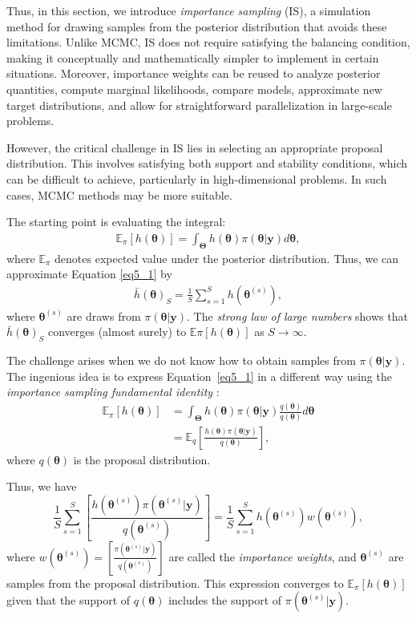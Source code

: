 Thus, in this section, we introduce \textit{importance sampling} (IS), a simulation method for drawing samples from the posterior distribution that avoids these limitations. Unlike MCMC, IS does not require satisfying the balancing condition, making it conceptually and mathematically simpler to implement in certain situations. Moreover, importance weights can be reused to analyze posterior quantities, compute marginal likelihoods, compare models, approximate new target distributions, and allow for straightforward parallelization in large-scale problems.

However, the critical challenge in IS lies in selecting an appropriate proposal distribution. This involves satisfying both support and stability conditions, which can be difficult to achieve, particularly in high-dimensional problems. In such cases, MCMC methods may be more suitable.

The starting point is evaluating the integral:
\begin{align}\label{eq5_1}
	\mathbb{E}_{\pi}[h(\bm{\theta})]=\int_{\bm{\Theta}} h(\bm{\theta}) \pi(\bm{\theta}|\bm{y})d\bm{\theta},
\end{align}
where $\mathbb{E}_{\pi}$ denotes expected value under the posterior distribution.
Thus, we can approximate Equation \ref{eq5_1} by
\begin{align}\label{eq5_2}
	\bar{h}(\bm{\theta})_S=\frac{1}{S}\sum_{s=1}^S h(\bm{\theta}^{(s)}), 
\end{align}
where $\bm{\theta}^{(s)}$ are draws from $\pi(\bm{\theta}|\bm{y})$. The \textit{strong law of large numbers} shows that $\bar{h}(\bm{\theta})_S$ converges (almost surely) to $\mathbb{E}{\pi}[h(\bm{\theta})]$ as $S \rightarrow \infty$.

The challenge arises when we do not know how to obtain samples from $\pi(\bm{\theta}|\bm{y})$. The ingenious idea is to express Equation~\ref{eq5_1} in a different way using the \textit{importance sampling fundamental identity} \cite[Chap.~3]{robert2011monte}:
\begin{align}\label{eq5_3}
	\mathbb{E}_{\pi}[h(\bm{\theta})]&=\int_{\bm{\Theta}} h(\bm{\theta}) \pi(\bm{\theta}|\bm{y})\frac{q(\bm{\theta})}{q(\bm{\theta})}d\bm{\theta}\\
	&=\mathbb{E}_{q}\left[\frac{h(\bm{\theta})\pi(\bm{\theta}|\bm{y})}{q(\bm{\theta})}\right],
\end{align}   
where $q(\bm{\theta})$ is the proposal distribution.

Thus, we have $$\frac{1}{S}\sum_{s=1}^S \left[\frac{h(\bm{\theta}^{(s)})\pi(\bm{\theta}^{(s)}|\bm{y})}{q(\bm{\theta}^{(s)})}\right]= \frac{1}{S}\sum_{s=1}^S h(\bm{\theta}^{(s)})w(\bm{\theta}^{(s)}),$$ where $w(\bm{\theta}^{(s)})= \left[\frac{\pi(\bm{\theta}^{(s)}|\bm{y})}{q(\bm{\theta}^{(s)})}\right]$ are called the \textit{importance weights}, and $\bm{\theta}^{(s)}$ are samples from the proposal distribution. This expression converges to $\mathbb{E}_{\pi}[h(\bm{\theta})]$ given that the support of $q(\bm{\theta})$ includes the support of $\pi(\bm{\theta}^{(s)}|\bm{y})$.

